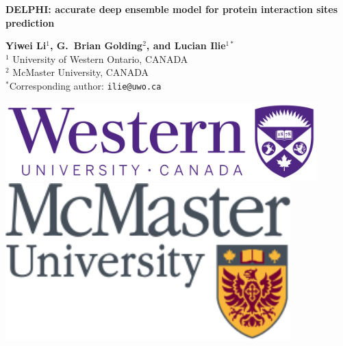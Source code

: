 \documentclass[a0,portrait]{a0poster}
\begin{document}


\noindent
\begin{minipage}[b]{0.8\linewidth}
{\veryHuge\color{NavyBlue} \textbf{DELPHI: accurate deep ensemble model for protein interaction sites prediction}}\\ %

\smallskip

\noindent
\begin{minipage}[m]{0.6\linewidth}
 \color{Black}
\huge \textbf{Yiwei Li$^1$, G.~Brian Golding$^2$, and Lucian Ilie$^{1*}$}\\ %
\huge $^1$ University of Western Ontario, CANADA\\ %
\huge $^2$ McMaster University, CANADA\\ %
{\normalsize $^*$Corresponding author: \texttt{ilie@uwo.ca}}
\end{minipage}
%
\begin{minipage}[m]{0.5\linewidth}
\includegraphics[width=12cm]{uwo_logo.jpg}
\hspace{1cm}
\vspace{1cm}
\includegraphics[width=11cm]{Poster_Li/figures/mcmaster_logo.png}\\
\end{minipage}
\end{minipage}
\end{document}
